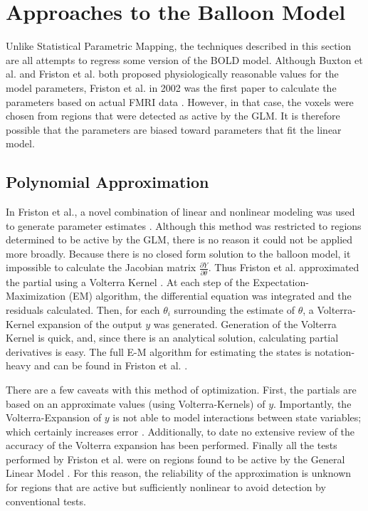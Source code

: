 \section{Approaches to the Balloon Model}
Unlike Statistical Parametric Mapping, the techniques described in this
section are all attempts to regress some version of the BOLD model. 
Although Buxton et al. and Friston et al. 
both proposed physiologically reasonable values for the model parameters, 
Friston et al. in 2002 was the first paper to calculate the parameters based 
on actual FMRI data \cite{Buxton1998, Friston2000, Friston2002b}. 
However, in that case, the voxels were chosen from
regions that were detected as active by the GLM. It is therefore possible
that the parameters are biased toward parameters that fit the linear model.

\subsection{Polynomial Approximation}
\label{sec:Background Linear Approximation}
In Friston et al., a novel combination of linear and nonlinear modeling
was used to generate parameter estimates \cite{Friston2002b}. 
Although this method was restricted to regions determined to be 
active by the GLM, there is no reason it could not be applied more broadly.
Because there is no closed 
form solution to the balloon model, it impossible to 
calculate the Jacobian matrix $\frac{\partial Y}{\partial \theta}$. Thus 
Friston et al. approximated the partial using a Volterra Kernel \cite{Friston2002b}. 
At each step of the Expectation-Maximization (EM) algorithm, 
the differential equation was integrated and the residuals
calculated. Then, for each $\theta_i$ surrounding the estimate of 
$\theta$, a Volterra-Kernel expansion of the output $y$ was generated. Generation
of the Volterra Kernel is quick, and, since there
is an analytical solution, calculating partial derivatives is easy. 
The full E-M algorithm for estimating the states is notation-heavy 
 and can be found in Friston et al. \cite{Friston2002b}.

There are a few caveats with this method of optimization. First, the 
partials are based on an approximate values (using Volterra-Kernels) of $y$.
Importantly, the Volterra-Expansion of $y$ is not able to model interactions
between state variables; which certainly increases error \cite{Friston2002b}.
Additionally, to date no extensive review of the accuracy of the 
Volterra expansion has been performed. Finally all the tests performed
by Friston et al. were on regions found to be active by the General
Linear Model \cite{Friston2002b}. For this reason, the reliability of 
the approximation is unknown for regions that are active but sufficiently 
nonlinear to avoid detection by conventional tests.

